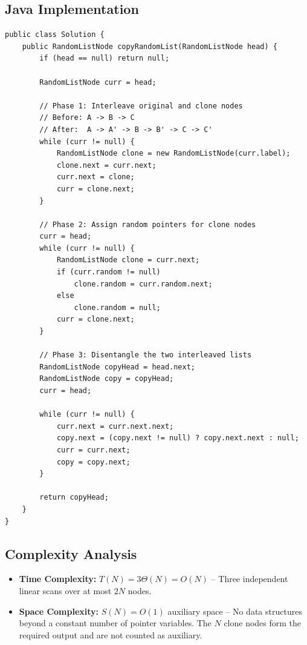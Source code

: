 \documentclass[10pt,journal,compsoc]{IEEEtran}
\begin{document}
\subsection{Java Implementation}

\begin{verbatim}
public class Solution {
    public RandomListNode copyRandomList(RandomListNode head) {
        if (head == null) return null;

        RandomListNode curr = head;

        // Phase 1: Interleave original and clone nodes
        // Before: A -> B -> C
        // After:  A -> A' -> B -> B' -> C -> C'
        while (curr != null) {
            RandomListNode clone = new RandomListNode(curr.label);
            clone.next = curr.next;
            curr.next = clone;
            curr = clone.next;
        }

        // Phase 2: Assign random pointers for clone nodes
        curr = head;
        while (curr != null) {
            RandomListNode clone = curr.next;
            if (curr.random != null)
                clone.random = curr.random.next;
            else
                clone.random = null;
            curr = clone.next;
        }

        // Phase 3: Disentangle the two interleaved lists
        RandomListNode copyHead = head.next;
        RandomListNode copy = copyHead;
        curr = head;

        while (curr != null) {
            curr.next = curr.next.next;
            copy.next = (copy.next != null) ? copy.next.next : null;
            curr = curr.next;
            copy = copy.next;
        }

        return copyHead;
    }
}
\end{verbatim}

\subsection{Complexity Analysis}

\begin{itemize}
    \item \textbf{Time Complexity:} $T(N) = 3\Theta(N) = O(N)$ -- Three independent linear scans over at most $2N$ nodes.
    \item \textbf{Space Complexity:} $S(N) = O(1)$ auxiliary space -- No data structures beyond a constant number of pointer variables. The $N$ clone nodes form the required output and are not counted as auxiliary.
\end{itemize}
\end{document}
